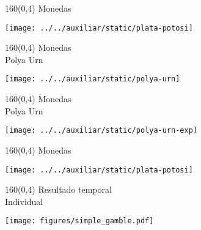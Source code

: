 \documentclass[shownotes,aspectratio=169]{beamer}
\begin{document}
\begin{frame}[plain]
 \begin{textblock}{160}(0,4)
  \centering \LARGE Monedas
 \end{textblock}

\vspace{1cm}

\texttt{[image: ../../auxiliar/static/plata-potosi]}
 
\end{frame}


\begin{frame}[plain]
 \begin{textblock}{160}(0,4)
  \centering \LARGE Monedas \\ \normalsize Polya Urn
 \end{textblock}

 \vspace{1cm}
\centering
\texttt{[image: ../../auxiliar/static/polya-urn]}

 \end{frame}


 \begin{frame}[plain]
 \begin{textblock}{160}(0,4)
  \centering \LARGE Monedas \\ \normalsize Polya Urn
 \end{textblock}

 \vspace{1cm}
\centering
\texttt{[image: ../../auxiliar/static/polya-urn-exp]}
 
 \end{frame}

 \begin{frame}[plain]
 \begin{textblock}{160}(0,4)
  \centering \LARGE Monedas
 \end{textblock}

\vspace{1cm}

\texttt{[image: ../../auxiliar/static/plata-potosi]}
 
\end{frame}
 
 
\begin{frame}[plain]
 \begin{textblock}{160}(0,4)
  \centering \Large Resultado temporal \\ \normalsize Individual
 \end{textblock}
 

 \centering
\vspace{1cm}
 
\texttt{[image: figures/simple\_gamble.pdf]}

\end{frame}
\end{document}
